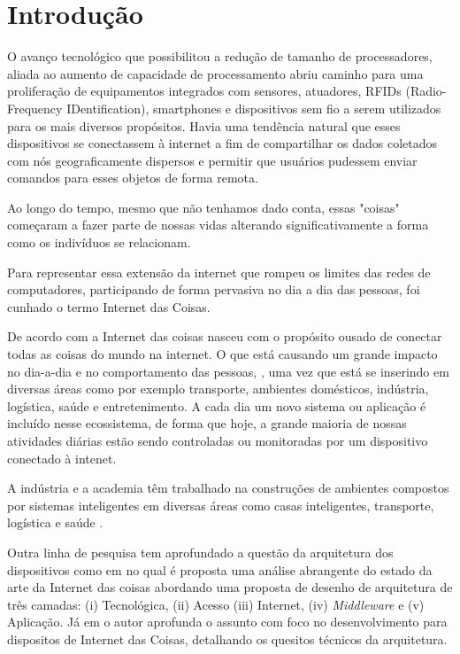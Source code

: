 %
%

\chapter{Introdução} \label{chap:Intro}
O avanço tecnológico que possibilitou a redução de tamanho de processadores, aliada ao aumento de capacidade de processamento abriu caminho para uma proliferação de equipamentos integrados com sensores, atuadores, RFIDs (Radio-Frequency IDentification), smartphones e dispositivos sem fio a serem utilizados para os mais diversos propósitos. Havia uma tendência natural que esses dispositivos se conectassem à internet a fim de compartilhar os dados coletados com nós geograficamente dispersos e permitir que usuários pudessem enviar comandos para esses objetos de forma remota.

Ao longo do tempo, mesmo que não tenhamos dado conta, essas "coisas" começaram a fazer parte de nossas vidas alterando significativamente a forma como os indivíduos se relacionam.


Para representar essa extensão da internet que rompeu os limites das redes de computadores, participando de forma pervasiva no dia a dia das pessoas, foi cunhado o termo Internet das Coisas.

De acordo com \cite{000-000} a Internet das coisas nasceu com o propósito ousado de conectar todas as coisas do mundo na internet. O que está causando um grande impacto no dia-a-dia e no comportamento das pessoas, \cite{000-003}, uma vez que está se inserindo em diversas áreas como por exemplo transporte, ambientes domésticos, indústria, logística, saúde e entretenimento. A cada dia um novo sistema ou aplicação é incluído nesse ecossistema, de forma que hoje, a grande maioria de nossas atividades diárias estão sendo controladas ou monitoradas por um dispositivo conectado à intenet.

A indústria e a academia têm trabalhado na construções de ambientes compostos por sistemas inteligentes em diversas áreas como casas inteligentes, transporte, logística e saúde \cite{000-000}.

Outra linha de pesquisa tem aprofundado a questão da arquitetura dos dispositivos como em \cite{000-006} no qual é proposta uma análise abrangente do estado da arte da Internet das coisas abordando uma proposta de desenho de arquitetura de três camadas: (i) Tecnológica, (ii) Acesso (iii) Internet, (iv) \textit{Middleware} e (v) Aplicação. Já em \cite{000-003} o autor aprofunda o assunto com foco no desenvolvimento para dispositos de Internet das Coisas, detalhando os quesitos técnicos da arquitetura.

